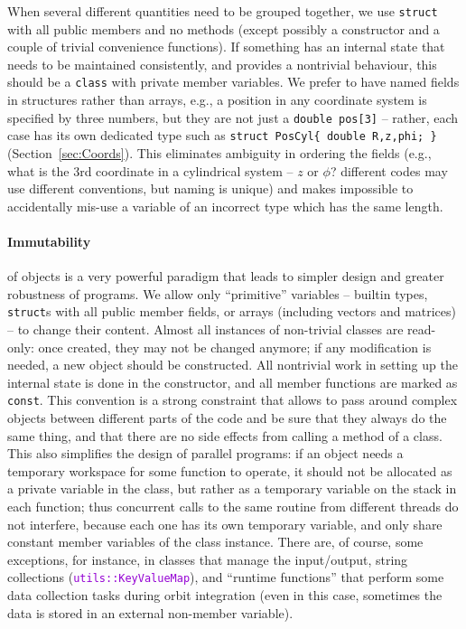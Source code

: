 \documentclass[12pt]{article}
\newcommand{\ttt}[1]{\textcolor{darkviolet}{\texttt{#1}}}
\let\oldparagraph\paragraph
\renewcommand{\paragraph}[1]{\vspace{-2mm}\oldparagraph{#1}}
\begin{document}
When several different quantities need to be grouped together, we use \texttt{struct} with all public members and no methods (except possibly a constructor and a couple of trivial convenience functions). If something has an internal state that needs to be maintained consistently, and provides a nontrivial behaviour, this should be a \texttt{class} with private member variables. We prefer to have named fields in structures rather than arrays, e.g., a position in any coordinate system is specified by three numbers, but they are not just a \texttt{double pos[3]} -- rather, each case has its own dedicated type such as \texttt{struct PosCyl\{ double R,z,phi; \}} (Section~\ref{sec:Coords}). This eliminates ambiguity in ordering the fields (e.g., what is the 3rd coordinate in a cylindrical system -- $z$ or $\phi$? different codes may use different conventions, but naming is unique) and makes impossible to accidentally mis-use a variable of an incorrect type which has the same length.

\paragraph{Immutability} \label{sec:Const}  of objects is a very powerful paradigm that leads to simpler design and greater robustness of programs. We allow only ``primitive'' variables -- builtin types, \texttt{struct}s with all public member fields, or arrays (including vectors and matrices) -- to change their content. Almost all instances of non-trivial classes are read-only: once created, they may not be changed anymore; if any modification is needed, a new object should be constructed. All nontrivial work in setting up the internal state is done in the constructor, and all member functions are marked as \texttt{const}. This convention is a strong constraint that allows to pass around complex objects between different parts of the code and be sure that they always do the same thing, and that there are no side effects from calling a method of a class. This also simplifies the design of parallel programs: if an object needs a temporary workspace for some function to operate, it should not be allocated as a private variable in the class, but rather as a temporary variable on the stack in each function; thus concurrent calls to the same routine from different threads do not interfere, because each one has its own temporary variable, and only share constant member variables of the class instance.
There are, of course, some exceptions, for instance, in classes that manage the input/output, string collections (\ttt{utils::KeyValueMap}), and ``runtime functions'' that perform some data collection tasks during orbit integration (even in this case, sometimes the data is stored in an external non-member variable).
\end{document}
